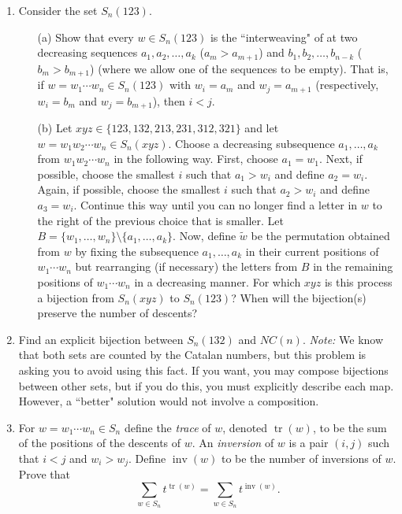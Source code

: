 \documentclass[11pt]{scrartcl}
\theoremstyle{definition}
\newcommand{\tr}{\operatorname{tr}}
\newcommand{\inv}{\operatorname{inv}}
\begin{document}
\begin{enumerate}

\item Consider the set $S_n(123)$.
\begin{enumerate}
\item[(a)] Show that every $w\in S_n(123)$ is the ``interweaving" of at two decreasing sequences $a_1,a_2,\ldots, a_k$ ($a_m>a_{m+1}$) and $b_1,b_2,\ldots,b_{n-k}$ ($b_m>b_{m+1}$) (where we allow one of the sequences to be empty).  That is, if $w=w_1\cdots w_n\in S_n(123)$ with $w_i=a_m$ and $w_j=a_{m+1}$ (respectively, $w_i=b_m$ and $w_j=b_{m+1}$), then $i<j$.
\item[(b)] Let $xyz\in\{123,132,213,231,312,321\}$ and let $w=w_1w_2\cdots w_n\in S_n(xyz)$.  Choose a decreasing subsequence $a_1,\ldots,a_k$ from $w_1w_2\cdots w_n$ in the following way.  First, choose $a_1=w_1$.  Next, if possible, choose the smallest $i$ such that $a_1>w_i$ and define $a_2=w_i$. Again, if possible, choose the smallest $i$ such that $a_2>w_i$ and define $a_3=w_i$.  Continue this way until you can no longer find a letter in $w$ to the right of the previous choice that is smaller.  Let $B=\{w_1,\ldots,w_n\}\setminus \{a_1,\ldots,a_k\}$.  Now, define $\widetilde{w}$ be the permutation obtained from $w$ by fixing the subsequence $a_1,\ldots, a_k$ in their current positions of $w_1\cdots w_n$ but rearranging (if necessary) the letters from $B$ in the remaining positions of $w_1\cdots w_n$ in a decreasing manner.  For which $xyz$ is this process a bijection from $S_n(xyz)$ to $S_n(123)$?  When will the bijection(s) preserve the number of descents?
\end{enumerate}

\item Find an explicit bijection between $S_n(132)$ and $NC(n)$.  \emph{Note:} We know that both sets are counted by the Catalan numbers, but this problem is asking you to avoid using this fact.  If you want, you may compose bijections between other sets, but if you do this, you must explicitly describe each map.  However, a ``better" solution would not involve a composition.

\item For $w=w_1\cdots w_n\in S_n$ define the \emph{trace} of $w$, denoted $\tr(w)$, to be the sum of the positions of the descents of $w$.  An \emph{inversion} of $w$ is a pair $(i,j)$ such that $i<j$ and $w_i>w_j$. Define $\inv(w)$ to be the number of inversions of $w$.  Prove that
\[
\sum_{w\in S_n}t^{\tr(w)}=\sum_{w\in S_n}t^{\inv(w)}.
\]


\end{enumerate}
\end{document}
